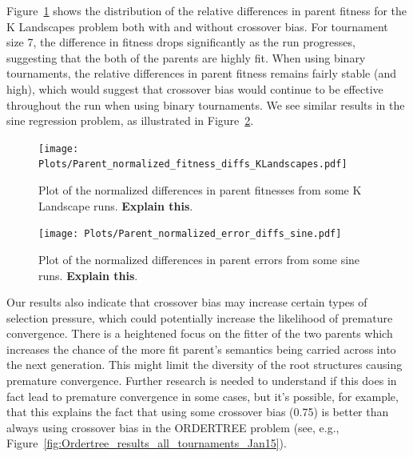 \documentclass{sig-alternate}
\begin{document}
Figure~\ref{fig:parentDiffsKLandscapes} shows the distribution of the relative differences in parent fitness for the K
Landscapes problem both with and without crossover bias. For tournament size 7, the difference in fitness drops
significantly as the run progresses, suggesting that the both of the parents are highly fit. When using binary
tournaments, the relative differences in parent fitness remains fairly stable (and high), which would suggest that
crossover bias would continue to be effective throughout the run when using binary tournaments. We see similar results
in the sine regression problem, as illustrated in Figure~\ref{fig:parentDiffsSine}.

\begin{figure}[tb]
\centering
\texttt{[image: Plots/Parent\_normalized\_fitness\_diffs\_KLandscapes.pdf]}
\caption{Plot of the normalized differences in parent fitnesses from some K Landscape runs. \textbf{Explain this}.}
\label{fig:parentDiffsKLandscapes}
\end{figure}

\begin{figure}[tb]
	\centering
	\texttt{[image: Plots/Parent\_normalized\_error\_diffs\_sine.pdf]}
	\caption{Plot of the normalized differences in parent errors from some sine runs. \textbf{Explain this}.}
	\label{fig:parentDiffsSine}
\end{figure}

Our results also indicate that crossover bias may increase certain types of selection pressure, which could potentially
increase the likelihood of premature convergence.
There is a heightened focus on the fitter of the two parents which increases the chance of the more fit parent's
semantics being carried across into the next generation. This might limit the diversity of the root structures causing
premature convergence. Further research is needed to understand if this does in fact lead to premature convergence in
some cases, but it's possible, for example, that this explains the fact that using some crossover bias (0.75) is better
than always using crossover bias in the ORDERTREE problem (see, e.g.,
Figure~\ref{fig:Ordertree_results_all_tournaments_Jan15}).

\end{document}
